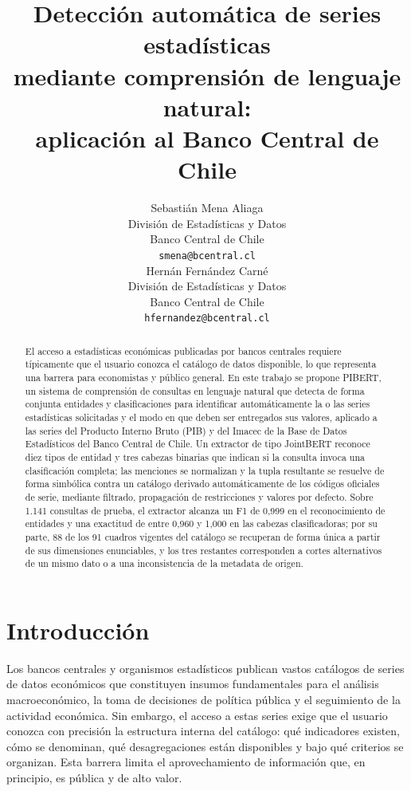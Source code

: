 \documentclass[11pt]{article}
\title{Detección automática de series estadísticas\\
mediante comprensión de lenguaje natural:\\
aplicación al Banco Central de Chile}
\author{%
  Sebastián Mena Aliaga\\
  División de Estadísticas y Datos\\
  Banco Central de Chile \\
  \texttt{smena@bcentral.cl}\\
\And
 Hernán Fernández Carné\\
  División de Estadísticas y Datos\\
  Banco Central de Chile \\
  \texttt{hfernandez@bcentral.cl}\\
}
\begin{document}
\maketitle

\begin{abstract}
    El acceso a estadísticas económicas publicadas por bancos centrales requiere
    típicamente que el usuario conozca el catálogo de datos disponible, lo que
    representa una barrera para economistas y público general. En este trabajo se
    propone PIBERT, un sistema de comprensión de consultas en lenguaje natural que
    detecta de forma conjunta entidades y clasificaciones para identificar
    automáticamente la o las series estadísticas solicitadas y el modo en que deben
    ser entregados sus valores, aplicado a las series del Producto Interno Bruto (PIB)
    y del Imacec de la Base de Datos Estadísticos del Banco Central de Chile. Un
    extractor de tipo JointBERT reconoce diez tipos de entidad y tres cabezas
    binarias que indican si la consulta invoca una clasificación completa; las
    menciones se normalizan y la tupla resultante se resuelve de forma simbólica
    contra un catálogo derivado automáticamente de los códigos oficiales de serie,
    mediante filtrado, propagación de restricciones y valores por defecto. Sobre
    1.141 consultas de prueba, el extractor alcanza un F1 de 0,999 en el
    reconocimiento de entidades y una exactitud de entre 0,960 y 1,000 en las
    cabezas clasificadoras; por su parte, 88 de los 91 cuadros vigentes del catálogo
    se recuperan de forma única a partir de sus dimensiones enunciables, y los tres
    restantes corresponden a cortes alternativos de un mismo dato o a una
    inconsistencia de la metadata de origen.
\end{abstract}

\section{Introducción}

Los bancos centrales y organismos estadísticos publican vastos catálogos de series
de datos económicos que constituyen insumos fundamentales para el análisis
macroeconómico, la toma de decisiones de política pública y el seguimiento de la
actividad económica. Sin embargo, el acceso a estas series exige que el usuario
conozca con precisión la estructura interna del catálogo: qué indicadores existen,
cómo se denominan, qué desagregaciones están disponibles y bajo qué criterios se
organizan. Esta barrera limita el aprovechamiento de información que, en principio,
es pública y de alto valor.
\end{document}
